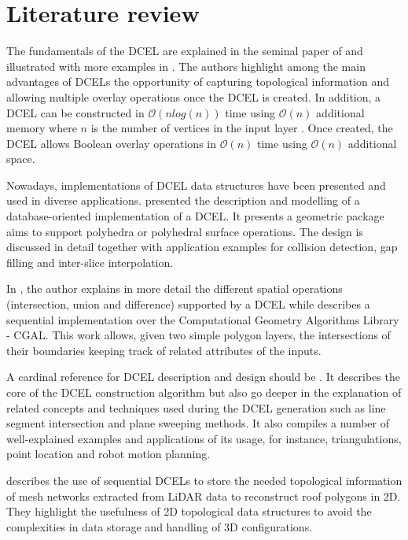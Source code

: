 \section{Literature review}
The fundamentals of the DCEL are explained in the seminal paper of \cite{muller_finding_1978} and illustrated with more examples in \cite{preparata_computational_1985}.  The authors highlight among the main advantages of DCELs the opportunity of capturing topological information and allowing multiple overlay operations once the DCEL is created.  In addition, a DCEL can be constructed in $\mathcal{O}(n log(n))$ time using $\mathcal{O}(n)$ additional memory where $n$ is the number of vertices in the input layer \cite{freiseisen_colored_1998}. Once created, the DCEL allows Boolean overlay operations in $\mathcal{O}(n)$ time using $\mathcal{O}(n)$ additional space. 

Nowadays, implementations of DCEL data structures have been presented and used in diverse applications.  \cite{barequet_dcel_1998} presented the description and modelling of a database-oriented implementation of a DCEL. It presents a geometric package aims to support polyhedra or polyhedral surface operations.  The design is discussed in detail together with application examples for collision detection, gap filling and inter-slice interpolation.

In \cite{freiseisen_colored_1998}, the author explains in more detail the different spatial operations (intersection, union and difference) supported by a DCEL while describes a sequential implementation over the Computational Geometry Algorithms Library - CGAL.  This work allows, given two simple polygon layers, the intersections of their boundaries keeping track of related attributes of the inputs.  

A cardinal reference for DCEL description and design should be \cite{berg_computational_2008}.  It describes the core of the DCEL construction algorithm but also go deeper in the explanation of related concepts and techniques used during the DCEL generation such as line segment intersection and plane sweeping methods.  It also compiles a number of well-explained examples and applications of its usage, for instance, triangulations, point location and robot motion planning.

\cite{boltcheva_topological-based_2020} describes the use of sequential DCELs to store the needed topological information of mesh networks extracted from LiDAR data to reconstruct roof polygons in 2D.  They highlight the usefulness of 2D topological data structures to avoid the complexities in data storage and handling of 3D configurations.

